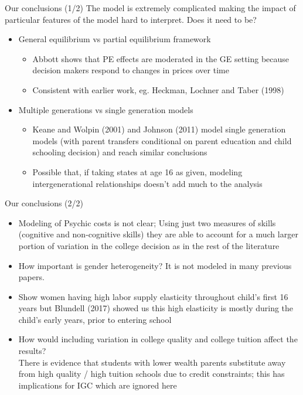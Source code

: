\documentclass{beamer}
\begin{document}
\begin{frame}{Our conclusions (1/2)}
The model is extremely complicated making the impact of particular features of the model hard to interpret. Does it need to be?
\begin{itemize}
\item General equilibrium vs partial equilibrium framework
\begin{itemize} 
\item Abbott shows that PE effects are moderated in the GE setting because decision makers respond to changes in prices over time
\item Consistent with earlier work, eg. Heckman, Lochner and Taber (1998)
\end{itemize}
\item Multiple generations vs single generation models
\begin{itemize}
\item Keane and Wolpin (2001) and Johnson (2011) model single generation models (with parent transfers conditional on parent education and child schooling decision) and reach similar conclusions
\item Possible that, if taking states at age 16 as given, modeling intergenerational relationships doesn't add much to the analysis
\end{itemize}

\end{itemize}
\end{frame}

\begin{frame}{Our conclusions (2/2)}
\begin{itemize}
\item Modeling of Psychic costs is not clear; Using just two measures of skills (cognitive and non-cognitive skills) they are able to account for a much larger portion of variation in the college decision as in the rest of the literature
\item How important is gender heterogeneity? It is not modeled in many previous papers.
\item Show women having high labor supply elasticity throughout child's first 16 years but Blundell (2017) showed us this high elasticity is mostly during the child's early years, prior to entering school
\item How would including variation in college quality and college tuition affect the results? \\
There is evidence that students with lower wealth parents substitute away from high quality / high tuition schools due to credit constraints; this has implications for IGC which are ignored here
\end{itemize}
\end{frame}
\end{document}
